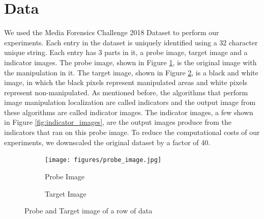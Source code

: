\section{Data}

We used the Media Forensics Challenge 2018 Dataset \cite{guan2019mfc} to perform our experiments. Each entry in the dataset 
is uniquely identified using a 32 character unique string. Each entry has 3 parts in it, a probe image, target image and a 
indicator images. The probe image, shown in Figure \ref{fig:probe_image}, is the original image with the manipulation in it. 
The target image, shown in Figure \ref{fig:target_image}, is a black and white
image, in which the black pixels represent manipulated areas and white pixels represent non-manipulated.
As mentioned before, the algorithms that perform image manipulation localization are called indicators and the output image 
from these algorithms are 
called indicator images. The indicator images, a few shown in Figure \ref{fig:indicator_images}, are the output images
produce from the indicators that ran on this probe 
image. To reduce the computational costs of our experiments, we downscaled the original dataset by a factor of 40. 

\begin{figure}
    \centering
    \begin{subfigure}{.49\textwidth}
    \centering
      \texttt{[image: figures/probe\_image.jpg]}
      \caption{Probe Image}
      \label{fig:probe_image}
    \end{subfigure}
    \begin{subfigure}{.49\textwidth}
    \centering
      \caption{Target Image}
      \label{fig:target_image}
    \end{subfigure}
    \caption{Probe and Target image of a row of data}
    \label{fig:probe_target_image}
\end{figure}


